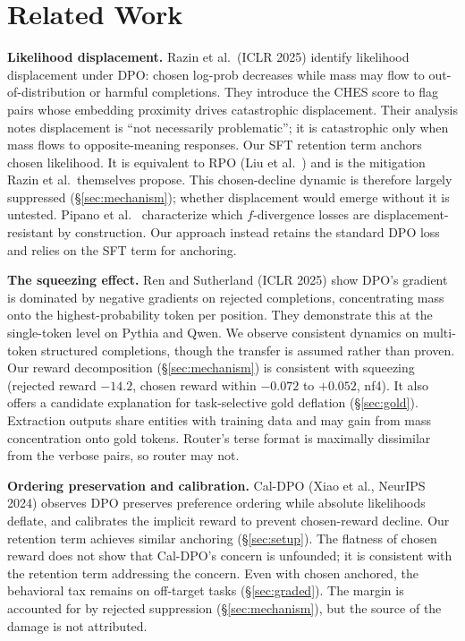 \documentclass{article}
\begin{document}
\section{Related Work}

\textbf{Likelihood displacement.} Razin et al.\ (ICLR 2025) \cite{razin2025displacement} identify likelihood displacement under DPO: chosen log-prob decreases while mass may flow to out-of-distribution or harmful completions. They introduce the CHES score to flag pairs whose embedding proximity drives catastrophic displacement. Their analysis notes displacement is ``not necessarily problematic''; it is catastrophic only when mass flows to opposite-meaning responses. Our SFT retention term anchors chosen likelihood. It is equivalent to RPO (Liu et al.\ \citep{liu2024rpo}) and is the mitigation Razin et al.\ themselves propose. This chosen-decline dynamic is therefore largely suppressed (\S\ref{sec:mechanism}); whether displacement would emerge without it is untested. Pipano et al.\ \citep{pipano2026displacement} characterize which $f$-divergence losses are displacement-resistant by construction. Our approach instead retains the standard DPO loss and relies on the SFT term for anchoring.

\textbf{The squeezing effect.} Ren and Sutherland (ICLR 2025) \cite{ren2025squeezing} show DPO's gradient is dominated by negative gradients on rejected completions, concentrating mass onto the highest-probability token per position. They demonstrate this at the single-token level on Pythia and Qwen. We observe consistent dynamics on multi-token structured completions, though the transfer is assumed rather than proven. Our reward decomposition (\S\ref{sec:mechanism}) is consistent with squeezing (rejected reward $-14.2$, chosen reward within $-0.072$ to $+0.052$, nf4). It also offers a candidate explanation for task-selective gold deflation (\S\ref{sec:gold}). Extraction outputs share entities with training data and may gain from mass concentration onto gold tokens. Router's terse format is maximally dissimilar from the verbose pairs, so router may not.

\textbf{Ordering preservation and calibration.} Cal-DPO (Xiao et al., NeurIPS 2024) \cite{xiao2024caldpo} observes DPO preserves preference ordering while absolute likelihoods deflate, and calibrates the implicit reward to prevent chosen-reward decline. Our retention term achieves similar anchoring (\S\ref{sec:setup}). The flatness of chosen reward does not show that Cal-DPO's concern is unfounded; it is consistent with the retention term addressing the concern. Even with chosen anchored, the behavioral tax remains on off-target tasks (\S\ref{sec:graded}). The margin is accounted for by rejected suppression (\S\ref{sec:mechanism}), but the source of the damage is not attributed.
\end{document}
